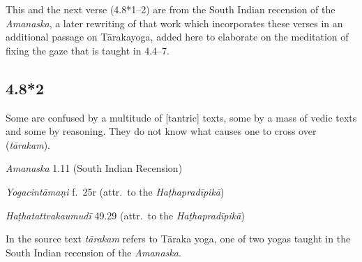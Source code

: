 \begin{ekdosis}
\begin{philcomm}[hp04_008_1]
This and the next verse (4.8*1–2) are from the South Indian recension of the \emph{Amanaska}, a later rewriting of that work which incorporates these verses in an additional passage on Tārakayoga, added here to elaborate on the meditation of fixing the gaze that is taught in 4.4–7. 
\end{philcomm}

\subsection*{4.8*2}
\begin{translation}[hp04_008_2]
Some are confused by a multitude of [tantric] texts, some by a mass of vedic texts and some by reasoning. They do not know what causes one to cross over (\emph{tārakam}).%
\end{translation}


\begin{sources}[hp04_008_2]
\emph{Amanaska} 1.11 (South Indian Recension)
\begin{versinnote}
\end{versinnote}
\end{sources}

\begin{testimonia}[hp04_008_2]
\emph{Yogacintāmaṇi} f.~25r (attr.~to the \emph{Haṭhapradīpikā})
\begin{versinnote}
\end{versinnote}

\emph{Haṭhatattvakaumudī} 49.29 (attr.~to the \emph{Haṭhapradīpikā})
\begin{versinnote}
\end{versinnote}
\end{testimonia}

\begin{philcomm}[hp04_008_2]
In the source text \emph{tārakam} refers to  Tāraka yoga, one of two yogas taught in the South Indian recension of the \emph{Amanaska}.


\end{philcomm}
\end{ekdosis}
